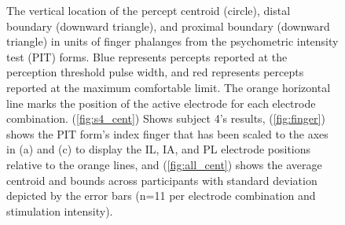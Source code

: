\documentclass[10pt]{iopart}
\begin{document}
\begin{figure}[b]
  \hspace*{-0.2cm} 
  \centering
  \caption{The vertical location of the percept centroid (circle), distal boundary (downward triangle), and proximal boundary (downward triangle) in units of finger phalanges from the psychometric intensity test (PIT) forms. Blue represents percepts reported at the perception threshold pulse width, and red represents percepts reported at the maximum comfortable limit. The orange horizontal line marks the position of the active electrode for each electrode combination. (\ref{fig:s4_cent}) Shows subject 4's results, (\ref{fig:finger}) shows the PIT form's index finger that has been scaled to the axes in (a) and (c) to display the IL, IA, and PL electrode positions relative to the orange lines, and (\ref{fig:all_cent}) shows the average centroid and bounds across participants with standard deviation depicted by the error bars (n=11 per electrode combination and stimulation intensity).}
\end{figure}
\end{document}
